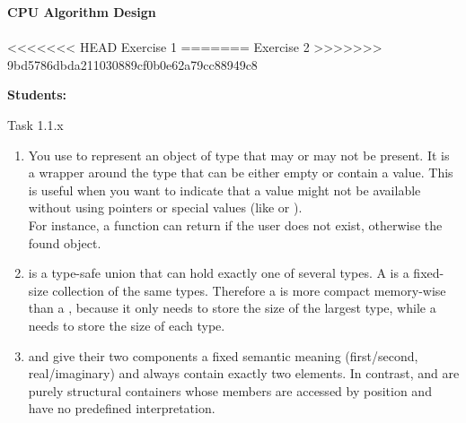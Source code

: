 





\begin{Large}
    \textsf{\textbf{CPU Algorithm Design}} \\
    \\
<<<<<<< HEAD
    Exercise 1
=======
    Exercise 2
>>>>>>> 9bd5786dbda211030889cf0b0e62a79cc88949c8
\end{Large}
\vspace{1ex}
\textsf{\textbf{Students:}}  \\
\vspace{2ex}

\begin{problem}{}{Task 1.1.x}
    \begin{enumerate}[(1)]
        \item 
            You use  to represent an object of type  that may or may not be present. 
            It is a wrapper around the type  that can be either empty or contain a value. 
            This is useful when you want to indicate that a value might not be available without using pointers or special 
            values (like  or ). \\
            For instance, a  function can return 
            if the user does not exist, otherwise the found  object.
        \item 
             is a type-safe union that can hold exactly one of several types. 
            A  is a fixed-size collection of the same types.
            Therefore a  is more compact memory-wise than a , 
            because it only needs to store the size of the largest type, while a  
            needs to store the size of each type.
        \item  
             and  give their two
            components a fixed semantic meaning (first/second,
            real/imaginary) and always contain exactly two elements.  
            In contrast,  and  are
            purely structural containers whose members are accessed by
            position and have no predefined interpretation.


\end{enumerate}
\end{problem}
